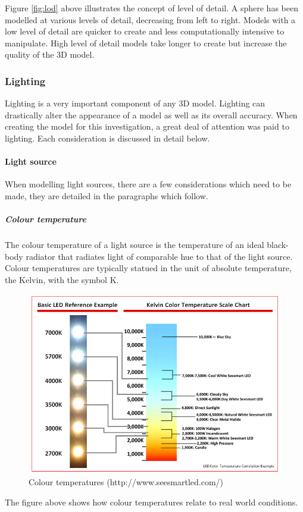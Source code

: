 \documentclass[11pt,a4paper]{report}
\begin{document}
			Figure \ref{fig:lod} above illustrates the concept of level of detail. A sphere has been modelled at various levels of detail, decreasing from left to right. Models with a low level of detail are quicker to create and less computationally intensive to manipulate. High level of detail models take longer to create but increase the quality of the 3D model.
			
			
			\subsubsection{Lighting}
				Lighting is a very important component of any 3D model. Lighting can drastically alter the appearance of a model as well as its overall accuracy. When creating the model for this investigation, a great deal of attention was paid to lighting. Each consideration is discussed in detail below.
				
				\paragraph{Light source}
					When modelling light sources, there are a few considerations which need to be made, they are detailed in the paragraphs which follow.
					\subparagraph{Colour temperature}
						The colour temperature of a light source is the temperature of an ideal black-body radiator that radiates light of comparable hue to that of the light source. Colour temperatures are typically statued in the unit of absolute temperature, the Kelvin, with the symbol K.
						\begin{figure}[H]
							\centering
							\includegraphics[width=1\textwidth]{colour_temperature}
							\caption{Colour temperatures (http://www.seesmartled.com/)}
						\end{figure}
						The figure above shows how colour temperatures relate to real world conditions.
				
\end{document}
